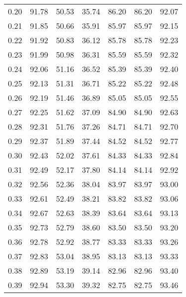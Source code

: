 \begin{tabular}{|c|c|c|c|c|c|c|}
      0.20 &     91.78 &     50.53 &      35.74 &   86.20 &      86.20 &         92.07 \\
      0.21 &     91.85 &     50.66 &      35.91 &   85.97 &      85.97 &         92.15 \\
      0.22 &     91.92 &     50.83 &      36.12 &   85.78 &      85.78 &         92.23 \\
      0.23 &     91.99 &     50.98 &      36.31 &   85.59 &      85.59 &         92.32 \\
      0.24 &     92.06 &     51.16 &      36.52 &   85.39 &      85.39 &         92.40 \\
      0.25 &     92.13 &     51.31 &      36.71 &   85.22 &      85.22 &         92.48 \\
      0.26 &     92.19 &     51.46 &      36.89 &   85.05 &      85.05 &         92.55 \\
      0.27 &     92.25 &     51.62 &      37.09 &   84.90 &      84.90 &         92.63 \\
      0.28 &     92.31 &     51.76 &      37.26 &   84.71 &      84.71 &         92.70 \\
      0.29 &     92.37 &     51.89 &      37.44 &   84.52 &      84.52 &         92.77 \\
      0.30 &     92.43 &     52.02 &      37.61 &   84.33 &      84.33 &         92.84 \\
      0.31 &     92.49 &     52.17 &      37.80 &   84.14 &      84.14 &         92.92 \\
      0.32 &     92.56 &     52.36 &      38.04 &   83.97 &      83.97 &         93.00 \\
      0.33 &     92.61 &     52.49 &      38.21 &   83.82 &      83.82 &         93.06 \\
      0.34 &     92.67 &     52.63 &      38.39 &   83.64 &      83.64 &         93.13 \\
      0.35 &     92.73 &     52.79 &      38.60 &   83.50 &      83.50 &         93.20 \\
      0.36 &     92.78 &     52.92 &      38.77 &   83.33 &      83.33 &         93.26 \\
      0.37 &     92.83 &     53.04 &      38.95 &   83.13 &      83.13 &         93.33 \\
      0.38 &     92.89 &     53.19 &      39.14 &   82.96 &      82.96 &         93.40 \\
      0.39 &     92.94 &     53.30 &      39.32 &   82.75 &      82.75 &         93.46 \\

\end{tabular}
